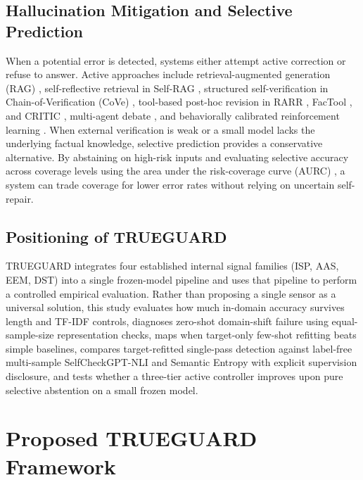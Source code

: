 \documentclass{ieeeaccess}
\begin{document}
\subsection{Hallucination Mitigation and Selective Prediction}
When a potential error is detected, systems either attempt active correction or refuse to answer. Active approaches include retrieval-augmented generation (RAG) \cite{review25}, self-reflective retrieval in Self-RAG \cite{review26}, structured self-verification in Chain-of-Verification (CoVe) \cite{review24}, tool-based post-hoc revision in RARR \cite{review33}, FacTool \cite{review34}, and CRITIC \cite{review39}, multi-agent debate \cite{review31}, and behaviorally calibrated reinforcement learning \cite{review15}. When external verification is weak or a small model lacks the underlying factual knowledge, selective prediction provides a conservative alternative. By abstaining on high-risk inputs and evaluating selective accuracy across coverage levels using the area under the risk-coverage curve (AURC) \cite{geifman2017selective}, a system can trade coverage for lower error rates without relying on uncertain self-repair.

\subsection{Positioning of TRUEGUARD}
TRUEGUARD integrates four established internal signal families (ISP, AAS, EEM, DST) into a single frozen-model pipeline and uses that pipeline to perform a controlled empirical evaluation. Rather than proposing a single sensor as a universal solution, this study evaluates how much in-domain accuracy survives length and TF-IDF controls, diagnoses zero-shot domain-shift failure using equal-sample-size representation checks, maps when target-only few-shot refitting beats simple baselines, compares target-refitted single-pass detection against label-free multi-sample SelfCheckGPT-NLI and Semantic Entropy with explicit supervision disclosure, and tests whether a three-tier active controller improves upon pure selective abstention on a small frozen model.

\section{Proposed TRUEGUARD Framework}
\label{sec:framework}
\end{document}
